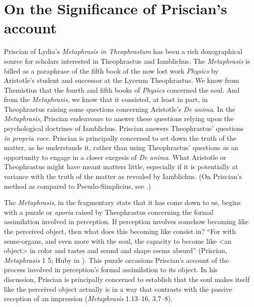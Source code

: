 \documentclass[12pt]{article}
\title{\mytitle}
\author{\myauthor}
\date{} %
\begin{document}
\maketitle

\setlength{\parindent}{1em}


\section{On the Significance of Priscian's account} %
\label{sec:on_the_significance_of_priscian_s_account}

Priscian of Lydia's \emph{Metaphrasis in Theophrastum} has been a rich doxographical source for scholars interested in Theophrastus and Iamblichus. The \emph{Metaphrasis} is billed as a paraphrase of the fifth book of the now lost work \emph{Physics} by Aristotle's student and successor at the Lyceum Theophrastus. We know from Themistius that the fourth and fifth books of \emph{Physics} concerned the soul. And from the \emph{Metaphrasis}, we know that it consisted, at least in part, in Theophrastus raising some questions concerning Aristotle's \emph{De anima}. In the \emph{Metaphrasis}, Priscian endeavours to answer these questions relying upon the psychological doctrines of Iamblichus. Priscian answers Theophrastus' questions \emph{in propria voce}. Priscian is principally concerned to set down the truth of the matter, as he understands it, rather than using Theophrastus' questions as an opportunity to engage in a closer exegesis of \emph{De anima}. What Aristotle or Theophrastus might have meant matters little, especially if it is potentially at variance with the truth of the matter as revealed by Iamblichus. (On Priscian's method as compared to Pseudo-Simplicius, see \citealt[7--10]{Steel:1978th}.)

The \emph{Metaphrasis}, in the fragmentary state that it has come down to us, begins with a puzzle or \emph{aporia} raised by Theophrastus concerning the formal assimilation involved in perception. If perception involves somehow becoming like the perceived object, then what does this becoming like consist in? ``For with sense-organs, and even more with the soul, the capacity to become like <an object> in color and tastes and sound and shape seems absurd'' (Priscian, \emph{Metaphrasis} 1 5; Huby in \citealt{Sorabji:1997ly}). This puzzle occasions Priscian's account of the process involved in perception's formal assimilation to its object. In his discussion, Priscian is principally concerned to establish that the soul makes itself like the perceived object actually is in a way that contrasts with the passive reception of an impression (\emph{Metaphrasis} 1.13--16, 3.7--8).
\end{document}
